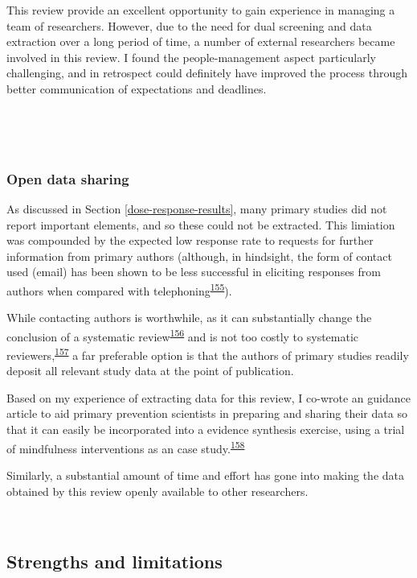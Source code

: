 \documentclass[a4paper, twoside]{templates/ociamthesis}
\begin{document}
This review provide an excellent opportunity to gain experience in managing a team of researchers. However, due to the need for dual screening and data extraction over a long period of time, a number of external researchers became involved in this review. I found the people-management aspect particularly challenging, and in retrospect could definitely have improved the process through better communication of expectations and deadlines.

~

~

\hypertarget{sys-rev-open-data}{%
\subsubsection{Open data sharing}\label{sys-rev-open-data}}

As discussed in Section \ref{dose-response-results}, many primary studies did not report important elements, and so these could not be extracted. This limiation was compounded by the expected low response rate to requests for further information from primary authors (although, in hindsight, the form of contact used (email) has been shown to be less successful in eliciting responses from authors when compared with telephoning\textsuperscript{\protect\hyperlink{ref-danko2019}{155}}).

While contacting authors is worthwhile, as it can substantially change the conclusion of a systematic review\textsuperscript{\protect\hyperlink{ref-meursingereynders2019}{156}} and is not too costly to systematic reviewers,\textsuperscript{\protect\hyperlink{ref-cooper2019}{157}} a far preferable option is that the authors of primary studies readily deposit all relevant study data at the point of publication.

Based on my experience of extracting data for this review, I co-wrote an guidance article to aid primary prevention scientists in preparing and sharing their data so that it can easily be incorporated into a evidence synthesis exercise, using a trial of mindfulness interventions as an case study.\textsuperscript{\protect\hyperlink{ref-hennessy2021}{158}}

Similarly, a substantial amount of time and effort has gone into making the data obtained by this review openly available to other researchers.

~

\hypertarget{strengths-and-limitations}{%
\subsection{Strengths and limitations}\label{strengths-and-limitations}}
\end{document}
